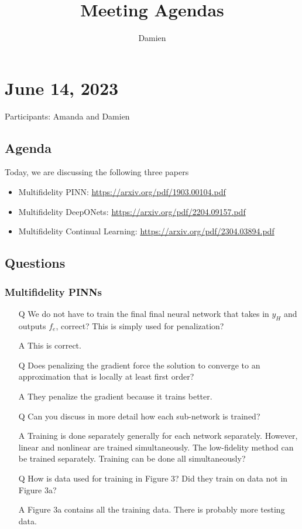 \documentclass{article}
\title{Meeting Agendas}
\author{Damien}
\begin{document}
\maketitle
\newpage
\section*{June 14, 2023}
Participants: Amanda and Damien
\subsection*{Agenda}
Today, we are discussing the following three papers
\begin{itemize}
	\item Multifidelity PINN: \url{https://arxiv.org/pdf/1903.00104.pdf}
	\item Multifidelity DeepONets: \url{https://arxiv.org/pdf/2204.09157.pdf}
	\item Multifidelity Continual Learning: \url{https://arxiv.org/pdf/2304.03894.pdf} 
\end{itemize}
\subsection*{Questions}
\subsubsection*{Multifidelity PINNs}
\begin{itemize}
	\item[Q] We do not have to train the final final neural network that takes in $y_H$ and outputs $f_e$, correct? This is simply used for penalization?
	\item[A] This is correct.
	\item[Q] Does penalizing the gradient force the solution to converge to an approximation that is locally at least first order?
	\item[A] They penalize the gradient because it trains better. 
	\item[Q] Can you discuss in more detail how each sub-network is trained?
	\item[A] Training is done separately generally for each network separately. However, linear and nonlinear are trained simultaneously. The low-fidelity method can be trained separately. Training can be done all simultaneously?
	\item[Q] How is data used for training in Figure 3? Did they train on data not in Figure 3a?
	\item[A] Figure 3a contains all the training data. There is probably more testing data.
\end{itemize}
\end{document}
